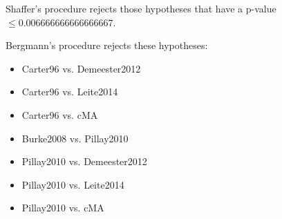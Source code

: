 \documentclass[a4paper,10pt]{article}
\begin{document}
\begin{landscape}
Shaffer's procedure rejects those hypotheses that have a p-value $\le0.006666666666666667$.


Bergmann's procedure rejects these hypotheses:


\begin{itemize}


\item Carter96 vs. Demeester2012
\item Carter96 vs. Leite2014
\item Carter96 vs. cMA
\item Burke2008 vs. Pillay2010
\item Pillay2010 vs. Demeester2012
\item Pillay2010 vs. Leite2014
\item Pillay2010 vs. cMA
\end{itemize}



\end{landscape}
\end{document}
